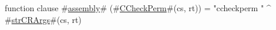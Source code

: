 function clause #\hyperref[sailMIPSzassembly]{assembly}# (#\hyperref[sailMIPSzCCheckPerm]{CCheckPerm}#(cs, rt)) = "ccheckperm " ^ #\hyperref[sailMIPSzstrCRArgs]{strCRArgs}#(cs, rt)
